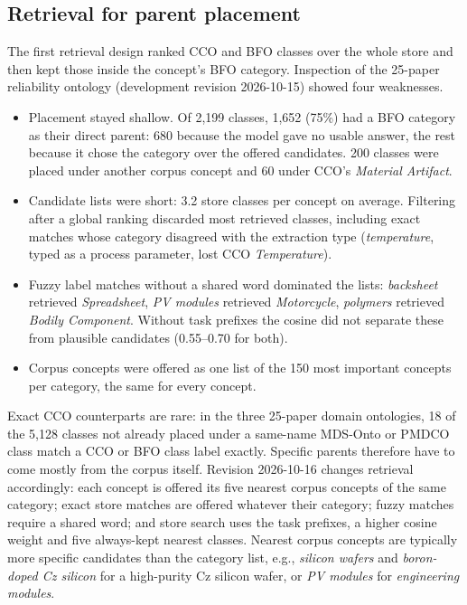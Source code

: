 \subsection{Retrieval for parent placement}

The first retrieval design ranked CCO and BFO classes over the whole store and then kept those inside the concept's BFO category. Inspection of the 25-paper reliability ontology (development revision 2026-10-15) showed four weaknesses.
\begin{itemize}
\item Placement stayed shallow. Of 2,199 classes, 1,652 (75\%) had a BFO category as their direct parent: 680 because the model gave no usable answer, the rest because it chose the category over the offered candidates. 200 classes were placed under another corpus concept and 60 under CCO's \emph{Material Artifact}.
\item Candidate lists were short: 3.2 store classes per concept on average. Filtering after a global ranking discarded most retrieved classes, including exact matches whose category disagreed with the extraction type (\emph{temperature}, typed as a process parameter, lost CCO \emph{Temperature}).
\item Fuzzy label matches without a shared word dominated the lists: \emph{backsheet} retrieved \emph{Spreadsheet}, \emph{PV modules} retrieved \emph{Motorcycle}, \emph{polymers} retrieved \emph{Bodily Component}. Without task prefixes the cosine did not separate these from plausible candidates (0.55--0.70 for both).
\item Corpus concepts were offered as one list of the 150 most important concepts per category, the same for every concept.
\end{itemize}

Exact CCO counterparts are rare: in the three 25-paper domain ontologies, 18 of the 5,128 classes not already placed under a same-name MDS-Onto or PMDCO class match a CCO or BFO class label exactly. Specific parents therefore have to come mostly from the corpus itself. Revision 2026-10-16 changes retrieval accordingly: each concept is offered its five nearest corpus concepts of the same category; exact store matches are offered whatever their category; fuzzy matches require a shared word; and store search uses the task prefixes, a higher cosine weight and five always-kept nearest classes. Nearest corpus concepts are typically more specific candidates than the category list, e.g., \emph{silicon wafers} and \emph{boron-doped Cz silicon} for a high-purity Cz silicon wafer, or \emph{PV modules} for \emph{engineering modules}.

